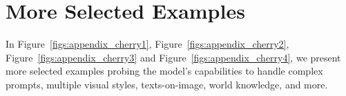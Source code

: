\section{More Selected Examples}
In Figure~\ref{figs:appendix_cherry1}, Figure~\ref{figs:appendix_cherry2}, Figure~\ref{figs:appendix_cherry3} and Figure~\ref{figs:appendix_cherry4}, we present more selected examples probing the model's capabilities to handle complex prompts, multiple visual styles, texts-on-image, world knowledge, and more.




